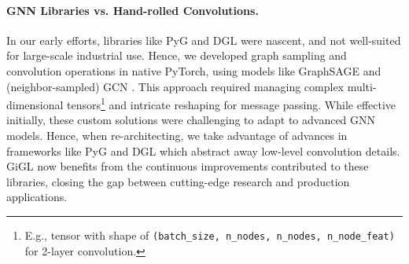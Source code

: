 \paragraph{GNN Libraries vs. Hand-rolled Convolutions.} In our early efforts, libraries like PyG \cite{Fey2019pyg} and DGL \cite{wang2019dgl} were nascent, and not well-suited for large-scale industrial use. 
Hence, we developed graph sampling and convolution operations in native PyTorch, using models like GraphSAGE \cite{hamilton2017inductive} and (neighbor-sampled) GCN \cite{kipf2016semi}.
This approach required managing complex multi-dimensional tensors\footnote{E.g., tensor with shape of \texttt{(batch\_size, n\_nodes, n\_nodes, n\_node\_feat)} for 2-layer convolution.} and intricate reshaping
for message passing.
While effective initially, these custom solutions were challenging to adapt to advanced GNN models. Hence, when re-architecting, we take advantage of advances in frameworks like PyG and DGL which abstract away low-level convolution details. GiGL now benefits from the continuous improvements contributed to these libraries, closing the gap between cutting-edge research and production applications.

